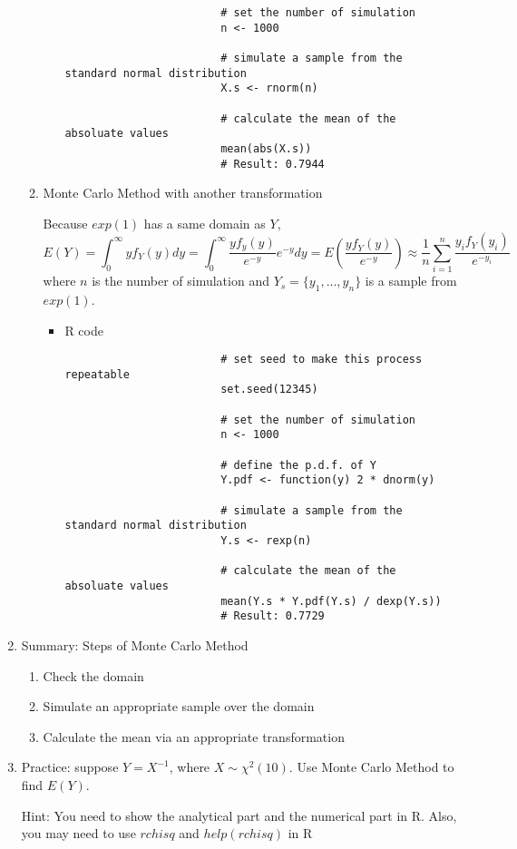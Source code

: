 \begin{enumerate}
\begin{enumerate}
\begin{itemize}
\begin{verbatim}
						# set the number of simulation
						n <- 1000
						
						# simulate a sample from the standard normal distribution
						X.s <- rnorm(n)
						
						# calculate the mean of the absoluate values
						mean(abs(X.s))
						# Result: 0.7944
					\end{verbatim}
				\end{itemize}
			\item Monte Carlo Method with another transformation
				\par Because $exp(1)$ has a same domain as $Y$, 
				\begin{equation*}
					E(Y) = \int_{0}^{\infty}yf_Y(y)dy = \int_{0}^{\infty}\frac{yf_y(y)}{e^{-y}}e^{-y}dy = E(\frac{yf_Y(y)}{e^{-y}}) \approx \frac{1}{n}\sum_{i=1}^{n}\frac{y_if_Y(y_i)}{e^{-y_i}}
				\end{equation*}
				where $n$ is the number of simulation and $Y_s = \{y_1, ..., y_n\}$ is a sample from $exp(1)$.
				\begin{itemize}
					\item R code
					\begin{verbatim}
						# set seed to make this process repeatable
						set.seed(12345)
						
						# set the number of simulation
						n <- 1000
						
						# define the p.d.f. of Y
						Y.pdf <- function(y) 2 * dnorm(y)
						
						# simulate a sample from the standard normal distribution
						Y.s <- rexp(n)
						
						# calculate the mean of the absoluate values
						mean(Y.s * Y.pdf(Y.s) / dexp(Y.s))
						# Result: 0.7729
					\end{verbatim}
				\end{itemize}
		\end{enumerate}
	\item Summary: Steps of Monte Carlo Method
		\begin{enumerate}
			\item Check the domain
			\item Simulate an appropriate sample over the domain 
			\item Calculate the mean via an appropriate transformation
		\end{enumerate}
	\item Practice: suppose $Y = X^{-1}$, where $X \sim \chi^2(10)$. Use Monte Carlo Method to find $E(Y)$.
	\par Hint: You need to show the analytical part and the numerical part in R. Also, you may need to use $rchisq$ and $help(rchisq)$ in R
\end{enumerate}